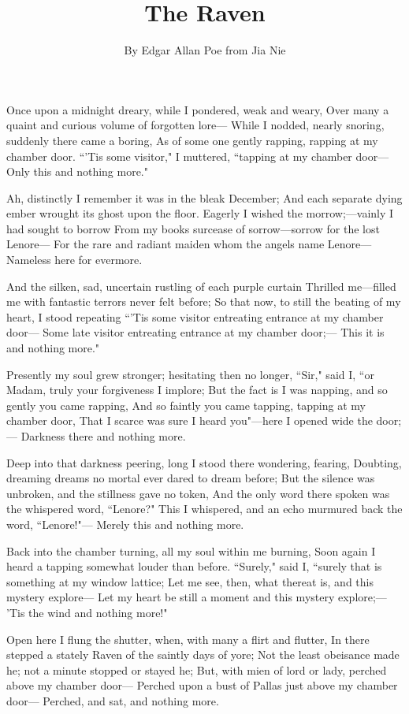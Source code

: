 \documentclass{article}
\title{The Raven}
\author{By Edgar Allan Poe from Jia Nie}
\begin{document}
\maketitle

Once upon a midnight dreary, while I pondered, weak and weary,
Over many a quaint and curious volume of forgotten lore---
  While I nodded, nearly snoring, suddenly there came a boring,
As of some one gently rapping, rapping at my chamber door.
``’Tis some visitor," I muttered, ``tapping at my chamber door---
Only this and nothing more."

Ah, distinctly I remember it was in the bleak December;
And each separate dying ember wrought its ghost upon the floor.
Eagerly I wished the morrow;---vainly I had sought to borrow
From my books surcease of sorrow---sorrow for the lost Lenore---
For the rare and radiant maiden whom the angels name Lenore---
Nameless here for evermore.

And the silken, sad, uncertain rustling of each purple curtain
Thrilled me---filled me with fantastic terrors never felt before;
So that now, to still the beating of my heart, I stood repeating
``’Tis some visitor entreating entrance at my chamber door---
Some late visitor entreating entrance at my chamber door;---
This it is and nothing more."

Presently my soul grew stronger; hesitating then no longer,
``Sir," said I, ``or Madam, truly your forgiveness I implore;
But the fact is I was napping, and so gently you came rapping,
And so faintly you came tapping, tapping at my chamber door,
That I scarce was sure I heard you"---here I opened wide the door;---
Darkness there and nothing more.

Deep into that darkness peering, long I stood there wondering, fearing,
Doubting, dreaming dreams no mortal ever dared to dream before;
But the silence was unbroken, and the stillness gave no token,
And the only word there spoken was the whispered word, ``Lenore?"
This I whispered, and an echo murmured back the word, ``Lenore!"---
Merely this and nothing more.

Back into the chamber turning, all my soul within me burning,
Soon again I heard a tapping somewhat louder than before.
``Surely," said I, ``surely that is something at my window lattice;
Let me see, then, what thereat is, and this mystery explore---
Let my heart be still a moment and this mystery explore;---
’Tis the wind and nothing more!"

Open here I flung the shutter, when, with many a flirt and flutter,
In there stepped a stately Raven of the saintly days of yore;
Not the least obeisance made he; not a minute stopped or stayed he;
But, with mien of lord or lady, perched above my chamber door---
Perched upon a bust of Pallas just above my chamber door---
Perched, and sat, and nothing more.
\end{document}
